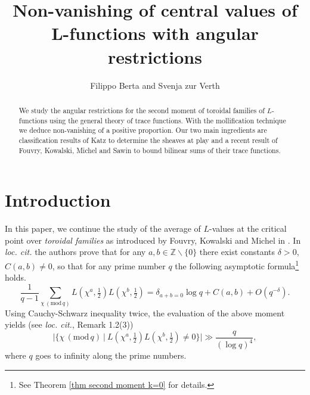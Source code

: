 \documentclass[12pt]{amsart}
\theoremstyle{plain}
\theoremstyle{definition}
\theoremstyle{remark}
\numberwithin{equation}{section}
\newcommand{\ZZ}{\mathbb{Z}}
\newcommand{\mods}[1]{\,(\mathrm{mod}\,{#1})}
\begin{document}
\title[Non-vanishing of central values with angular restrictions]{Non-vanishing of central values of L-functions with angular restrictions}
\author{Filippo Berta and Svenja zur Verth}

\begin{abstract}
We study the angular restrictions for the second moment of toroidal families of $L$-functions using the general theory of trace functions. With the mollification technique we deduce non-vanishing of a positive proportion. Our two main ingredients are classification results of Katz to determine the sheaves at play and a recent result of Fouvry, Kowalski, Michel and Sawin to bound bilinear sums of their trace functions. 
\end{abstract}

\maketitle
\tableofcontents




\section{Introduction}

In this paper, we continue the study of the average of $L$-values at the critical point over \emph{toroidal families} as introduced by Fouvry, Kowalski and Michel in \cite{FKMsecondmom}. In \emph{loc. cit.} the authors prove that for any $a,b\in \ZZ\smallsetminus\{0\}$  there exist constants $\delta>0$, $C(a,b) \neq 0$, so that for any prime number $q$ the following asymptotic formula\footnote{See Theorem \ref{thm second moment k=0} for details.} holds.
 \begin{equation}\label{eq:introduction0moment}
     \frac{1}{q-1}\sum_{\chi\mods{q}}L\left(\chi^a,\tfrac{1}{2}\right)L\left(\chi^b,\tfrac{1}{2}\right) = \delta_{a+b=0}\log q + C(a,b) + O(q^{-\delta}).
 \end{equation}
Using Cauchy-Schwarz inequality twice, the evaluation of the above moment yields (see \emph{loc. cit.}, Remark 1.2(3))
\begin{equation}\label{eq:intro 0 proportion of non vanishing}
    \vert \{\chi \mods{q}\ | \ L(\chi^a,\tfrac{1}{2})L(\chi^b,\tfrac{1}{2})\neq 0\}\vert \gg \frac{q}{(\log q)^4}, 
\end{equation}
where $q$ goes to infinity along the prime numbers.
\end{document}
